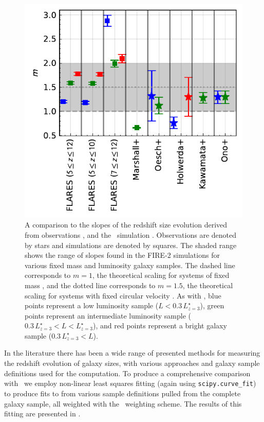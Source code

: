 \begin{figure}
    \includegraphics[width=\columnwidth]{Figures/SlopeComp_HalfLightRadius_evolution_pix_FAKE.TH.FUV_sim_default_All.pdf}
    \caption{A comparison to the slopes of the redshift size evolution derived from observations \citep{Oesch_2010, Ono_2013, Holwerda_2015, Kawamata_2018}, and the \bluetides\ simulation \citep{Marshall21}. Observations are denoted by stars and simulations are denoted by squares. The shaded range shows the range of slopes found in the FIRE-2 simulations \citep{Ma_18_size} for various fixed mass and luminosity galaxy samples. The dashed line corresponds to $m=1$, the theoretical scaling for systems of fixed mass \citep[e.g.][]{Bouwens_2004}, and the dotted line corresponds to $m=1.5$, the theoretical scaling for systems with fixed circular velocity \citep[e.g.][]{Ferguson_2004, Hathi_2008}. As with , blue points represent a low luminosity sample ($L < 0.3 \, L_{z=3}^{\star}$), green points represent an intermediate luminosity sample ($0.3 \, L_{z=3}^{\star} < L < L_{z=3}^{\star}$), and red points represent a bright galaxy sample ($0.3 \, L_{z=3}^{\star}<L$).}
    \label{fig:evoslopes}
\end{figure}

In the literature there has been a wide range of presented methods for measuring the redshift evolution of galaxy sizes, with various approaches and galaxy sample definitions used for the computation. To produce a comprehensive comparison with \flares\ we employ non-linear least squares fitting (again using \texttt{scipy.curve\_fit}) to produce fits to  from various sample definitions pulled from the complete galaxy sample, all weighted with the \flares\ weighting scheme. The results of this fitting are presented in .

